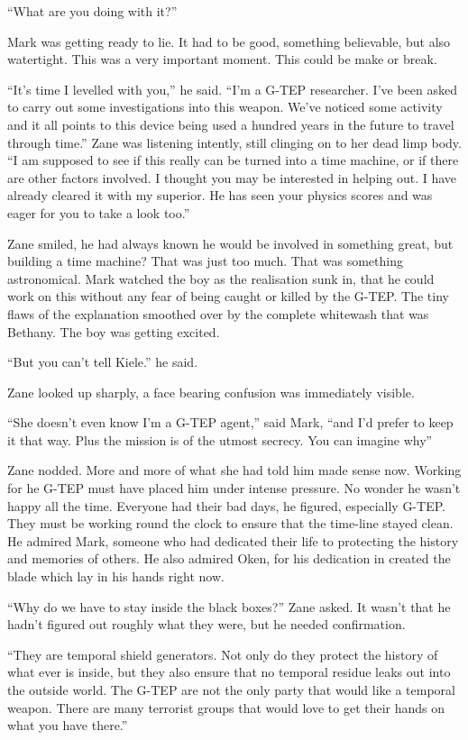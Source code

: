 ``What are you doing with it?''

Mark was getting ready to lie.  It had to be good, something believable, but also watertight.  This was a very important moment.  This could be make or break.

``It's time I levelled with you,'' he said.  ``I'm a G-TEP researcher.  I've been asked to carry out some investigations into this weapon.  We've noticed some activity and it all points to this device being used a hundred years in the future to travel through time.''  Zane was listening intently, still clinging on to her dead limp body.  ``I am supposed to see if this really can be turned into a time machine, or if there are other factors involved.  I thought you may be interested in helping out.  I have already cleared it with my superior.  He has seen your physics scores and was eager for you to take a look too.''

Zane smiled, he had always known he would be involved in something great, but building a time machine?  That was just too much.  That was something astronomical.  Mark watched the boy as the realisation sunk in, that he could work on this without any fear of being caught or killed by the G-TEP.  The tiny flaws of the explanation smoothed over by the complete whitewash that was Bethany.  The boy was getting excited.

``But you can't tell Kiele.'' he said.

Zane looked up sharply, a face bearing confusion was immediately visible.

``She doesn't even know I'm a G-TEP agent,'' said Mark, ``and I'd prefer to keep it that way.  Plus the mission is of the utmost secrecy.  You can imagine why''

Zane nodded.  More and more of what she had told him made sense now.  Working for he G-TEP must have placed him under intense pressure.  No wonder he wasn't happy all the time.  Everyone had their bad days, he figured, especially G-TEP.  They must be working round the clock to ensure that the time-line stayed clean.  He admired Mark, someone who had dedicated their life to protecting the history and memories of others.  He also admired Oken, for his dedication in created the blade which lay in his hands right now.

``Why do we have to stay inside the black boxes?'' Zane asked.  It wasn't that he hadn't figured out roughly what they were, but he needed confirmation.  

``They are temporal shield generators.  Not only do they protect the history of what ever is inside, but they also  ensure that no temporal residue leaks out into the outside world.  The G-TEP are not the only party that would like a temporal weapon.  There are many terrorist groups that would love to get their hands on what you have there.''

